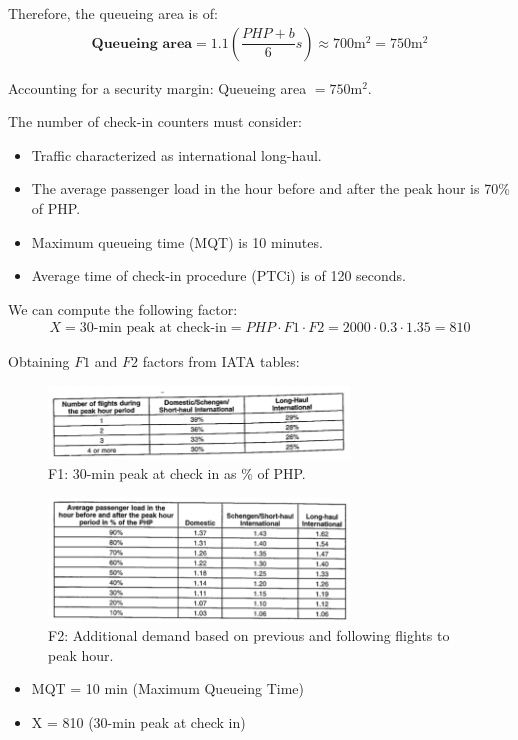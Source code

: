 \begin{enumerate}
Therefore, the queueing area is of:
\begin{align*}
\textbf{Queueing area}=1.1\left( \dfrac{PHP+b}{6}s\right) \approx 700 \mathrm{m^2} = 750 \mathrm{m^2}
\end{align*}

Accounting for a security margin: Queueing area $= 750\mathrm{m^2}$.

The number of check-in counters must consider:
\begin{itemize}
\item Traffic characterized as international long-haul.
\item The average passenger load in the hour before and after the peak hour is 70\% of PHP.
\item Maximum queueing time (MQT) is 10 minutes.
\item Average time of check-in procedure (PTCi) is of 120 seconds.
\end{itemize}

We can compute the following factor:
\begin{align*}
X = \text{30-min peak at check-in} = PHP\cdot F1\cdot F2 = 2000\cdot 0.3\cdot 1.35 = 810
\end{align*}

Obtaining $F1$ and $F2$ factors from IATA tables:

\begin{figure}[ht!]
	\centering
\includegraphics[width=8cm]{./images/IATA1}
\caption{F1: 30-min peak at check in as \% of PHP.}
\end{figure}

\begin{figure}[ht!]
	\centering
\includegraphics[width=8cm]{./images/IATA2}
\caption{F2: Additional demand based on previous and following flights to peak hour.}
\end{figure}

\begin{itemize}
\item MQT = 10 min (Maximum Queueing Time)
\item X = 810 (30-min peak at check in)
\end{itemize}


\end{enumerate}
